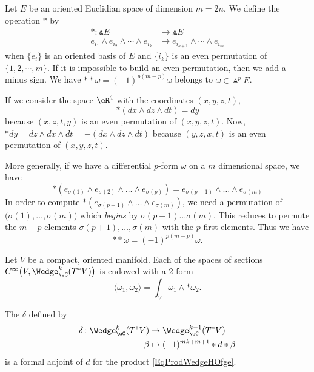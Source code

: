 Let $E$ be an oriented Euclidian space of dimension $m=2n$. We define the operation $*$ by
\begin{equation}		\label{EqGradWedge}
	\begin{aligned}
		*\colon \Wedge E&\to \Wedge E \\
		e_{i_1}\wedge e_{i_2}\wedge\cdots\wedge e_{i_k}&\mapsto e_{i_{k+1}}\wedge\cdots\wedge e_{i_m}
	\end{aligned}
\end{equation}
when $\{ e_i \}$ is an oriented basis of $E$ and $\{ i_k \}$ is an even permutation of $\{ 1,2,\cdots,m \}$. If it is impossible to build an even permutation, then we add a minus sign. We have $**\omega=(-1)^{p(m-p)}\omega$ belongs to $\omega\in\Wedge^pE$.

\begin{example}
	If we consider the space $\eR^4$ with the coordinates $(x,y,z,t)$,
	\begin{equation}
		*(dx\wedge dz\wedge dt)=dy
	\end{equation}
	because $(x,z,t,y)$ is an even permutation of $(x,y,z,t)$. Now, $*dy=dz\wedge dx\wedge dt=-(dx\wedge dz\wedge dt)$ because $(y,z,x,t)$ is an even permutation of $(x,y,z,t)$.

	More generally, if we have a differential $p$-form $\omega$ on a $m$ dimensional space, we have
	\begin{equation}
		*(e_{\sigma(1)}\wedge e_{\sigma(2)}\wedge\ldots\wedge e_{\sigma(p)})=e_{\sigma(p+1)}\wedge \ldots\wedge e_{\sigma(m)}
	\end{equation}
	In order to compute $*(e_{\sigma(p+1)}\wedge \ldots\wedge e_{\sigma(m)})$, we need a permutation of $\big( \sigma(1),\ldots, \sigma(m)\big)$ which \emph{begins} by $\sigma(p+1)\ldots\sigma(m)$. This reduces to permute the $m-p$ elements $\sigma(p+1),\ldots,\sigma(m)$ with the $p$ first elements. Thus we have
	\begin{equation}
		**\omega=(-1)^{p(m-p)}\omega.
	\end{equation}
\end{example}

Let $V$ be a compact, oriented manifold. Each of the spaces of sections $ C^{\infty}\big( V, \Wedge^k_{\eC}(T^*V)\big)$ is endowed with a $2$-form
\begin{equation}		\label{EqProdWedgeHOfge}
	\langle \omega_1, \omega_2\rangle =\int_V\omega_1\wedge *\omega_2.
\end{equation}

\begin{lemma}
	The  $\delta$ defined by
	\begin{equation}
		\begin{aligned}[]
			\delta	\colon \Wedge^k_{\eC}(T^*V)&\to \Wedge_{\eC}^{k-1}(T^*V)\\
			\beta				&\mapsto (-1)^{mk+m+1}*d*\beta
		\end{aligned}
	\end{equation}
	is a formal adjoint of $d$ for the product \eqref{EqProdWedgeHOfge}.
\end{lemma}

